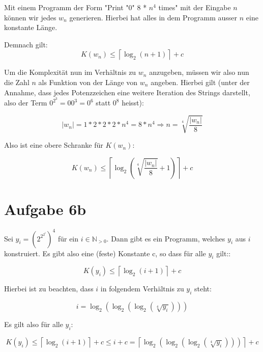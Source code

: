 \documentclass[a4paper]{article}
\begin{document}
	Mit einem Programm der Form "Print "0" 8 * $n^4$ times" mit der Eingabe $n$ können wir jedes $w_n$ generieren.
	Hierbei hat alles in dem Programm ausser $n$ eine konstante Länge.

	Demnach gilt:
	\[K(w_n) \leq \left \lceil{\log_2(n+1)}\right \rceil + c \]

	Um die Komplexität nun im Verhältnis zu $w_n$ anzugeben, müssen wir also nun die Zahl $n$ als Funktion von der Länge von $w_n$ angeben.
	Hierbei gilt (unter der Annahme, dass jedes Potenzzeichen eine weitere Iteration des Strings darstellt, also der Term $0^{2^3} = 00^3 = 0^6$ statt $0^8$ heisst):

	\[\lvert w_n \rvert = 1 * 2 * 2 * 2 * n^4 = 8 * n^4 \Rightarrow n = \sqrt[4]{\frac{\lvert w_n \rvert}{8}}\]

	Also ist eine obere Schranke für $K(w_n)$:

	\[K(w_n) \leq \left \lceil{\log_2({\sqrt[4]{\frac{\lvert w_n \rvert}{8}}} + 1)}\right \rceil + c\]

\section{Aufgabe 6b}

	Sei $y_i = (2^{2^{2^i}})^4$ für ein $i \in \mathbb{N}_{>0}$. Dann gibt es ein Programm, welches $y_i$ aus $i$ konstruiert. Es gibt also eine (feste) Konstante c, so dass für alle $y_i$ gilt::

	\[K(y_i) \leq \left \lceil{\log_2(i+1)}\right \rceil + c \]

	Hierbei ist zu beachten, dass $i$ in folgendem Verhältnis zu $y_i$ steht:
	
	\[i = \log_2(\log_2(\log_2(\sqrt[4]{y_i}))) \]

	Es gilt also für alle $y_i$:

	\[K(y_i) \leq \left \lceil{\log_2(i+1)}\right \rceil + c \leq i + c = \left \lceil{\log_2(\log_2(\log_2(\sqrt[4]{y_i})))}\right \rceil  + c \]
	 
\end{document}
